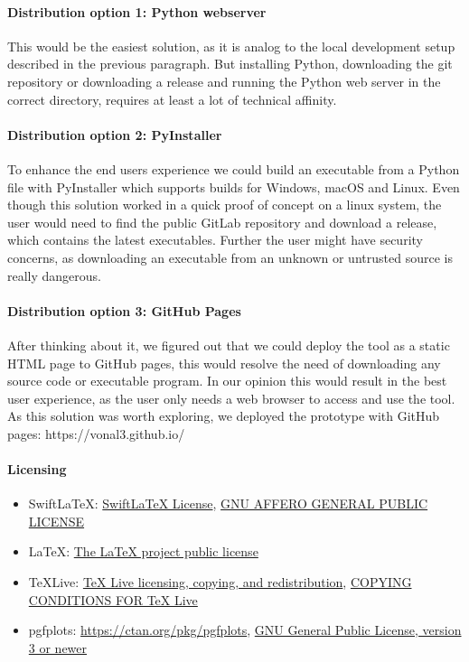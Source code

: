 \paragraph{Distribution option 1: Python webserver}\mbox{}\newline
This would be the easiest solution, as it is analog to the local development setup described in the previous paragraph.
But installing Python, downloading the git repository or downloading a release and running the Python web server in the correct directory, requires at least a lot of technical affinity.

\paragraph{Distribution option 2: PyInstaller}\mbox{}\newline
To enhance the end users experience we could build an executable from a Python file with PyInstaller which supports builds for Windows, macOS and Linux.
Even though this solution worked in a quick proof of concept on a linux system, the user would need to find the public GitLab repository and download a release, which contains the latest executables.
Further the user might have security concerns, as downloading an executable from an unknown or untrusted source is really dangerous.

\paragraph{Distribution option 3: GitHub Pages}\mbox{}\newline
After thinking about it, we figured out that we could deploy the tool as a static HTML page to GitHub pages, this would resolve the need of downloading any source code or executable program.
In our opinion this would result in the best user experience, as the user only needs a web browser to access and use the tool.
As this solution was worth exploring, we deployed the prototype with GitHub pages: https://vonal3.github.io/

\paragraph{Licensing}
\begin{itemize}
    \item SwiftLaTeX: \href{https://github.com/SwiftLaTeX/SwiftLaTeX/blob/master/LICENSE}{SwiftLaTeX License}, \href{https://www.gnu.org/licenses/agpl-3.0.en.html}{GNU AFFERO GENERAL PUBLIC LICENSE}
    \item LaTeX: \href{https://www.latex-project.org/lppl.txt}{The LaTeX project public license}
    \item TeXLive: \href{https://www.tug.org/texlive/copying.html}{TeX Live licensing, copying, and redistribution}, \href{https://www.tug.org/texlive/LICENSE.TL}{COPYING CONDITIONS FOR TeX Live}
    \item pgfplots: \href{https://ctan.org/pkg/pgfplots}{https://ctan.org/pkg/pgfplots}, \href{https://www.gnu.org/licenses/gpl-3.0.en.html}{GNU General Public License, version 3 or newer}
\end{itemize}

